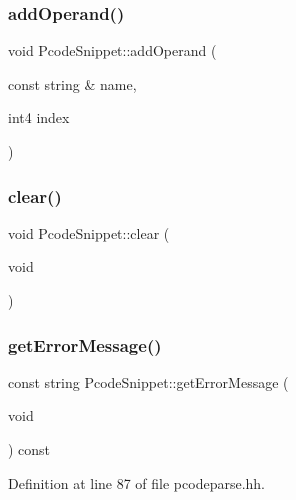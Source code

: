 \subsubsection{\texorpdfstring{addOperand()}{addOperand()}}
{\footnotesize\ttfamily void Pcode\+Snippet\+::add\+Operand (\begin{DoxyParamCaption}\item[{const string \&}]{name,  }\item[{int4}]{index }\end{DoxyParamCaption})}

\mbox{\label{class_pcode_snippet_a5b892587710fef5de90173cb73a055d8}} 
\subsubsection{\texorpdfstring{clear()}{clear()}}
{\footnotesize\ttfamily void Pcode\+Snippet\+::clear (\begin{DoxyParamCaption}\item[{void}]{ }\end{DoxyParamCaption})}

\mbox{\label{class_pcode_snippet_a5527551fede6c9930d31e359d57c49aa}} 
\subsubsection{\texorpdfstring{getErrorMessage()}{getErrorMessage()}}
{\footnotesize\ttfamily const string Pcode\+Snippet\+::get\+Error\+Message (\begin{DoxyParamCaption}\item[{void}]{ }\end{DoxyParamCaption}) const\hspace{0.3cm}{\ttfamily [inline]}}



Definition at line 87 of file pcodeparse.\+hh.

\mbox{\label{class_pcode_snippet_a9a577f3c196fe540314d7f887af3befc}} 
